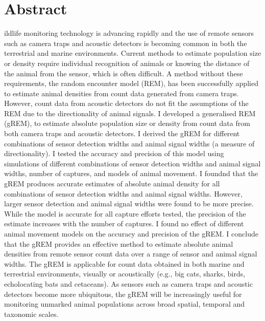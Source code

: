 %








  



\section{Abstract}
ildlife monitoring technology is advancing rapidly and the use of remote sensors such as camera traps and acoustic detectors is becoming common in both the terrestrial and marine environments.
Current methods to estimate population size or density require individual recognition of animals or knowing the distance of the animal from the sensor, which is often difficult.
A method without these requirements, the random encounter model (REM), has been successfully applied to estimate animal densities from count data generated from camera traps.
However, count data from acoustic detectors do not fit the assumptions of the REM due to the directionality of animal signals.
I developed a generalised REM (gREM), to estimate absolute population size or density from count data from both camera traps and acoustic detectors.
I derived the gREM for different combinations of sensor detection widths and animal signal widths (a measure of directionality).
I tested the accuracy and precision of this model using simulations of different combinations of sensor detection widths and animal signal widths, number of captures, and models of animal movement. 
I foundnd that the gREM produces accurate estimates of absolute animal density for all combinations of sensor detection widths and animal signal widths.
However, larger sensor detection and animal signal widths were found to be more precise.
While the model is accurate for all capture efforts tested, the precision of the estimate increases with the number of captures.
I found no effect of different animal movement models on the accuracy and precision of the gREM.  
I conclude that the gREM provides an effective method to estimate absolute animal densities from remote sensor count data over a range of sensor and animal signal widths.
The gREM is applicable for count data obtained in both marine and terrestrial environments, visually or acoustically (e.g., big cats, sharks, birds, echolocating bats and cetaceans).
As sensors such as camera traps and acoustic detectors become more ubiquitous, the gREM will be increasingly useful for monitoring unmarked animal populations across broad spatial, temporal and taxonomic scales. 

